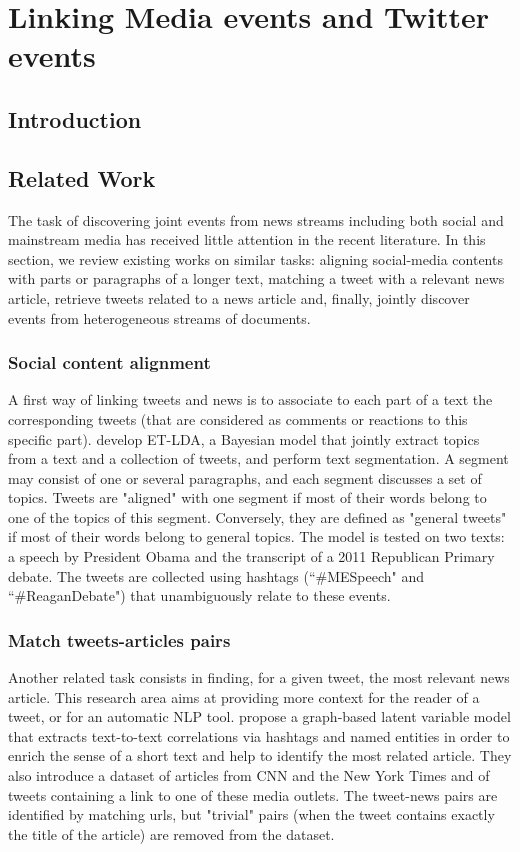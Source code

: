 \chapter{Linking Media events and Twitter events}
\section{Introduction}
\section{Related Work}

The task of discovering joint events from news streams including both social and mainstream media has received little attention in the recent literature. In this section, we review existing works on similar tasks: aligning social-media contents with parts or paragraphs of a longer text, matching a tweet with a relevant news article, retrieve tweets related to a news article and, finally, jointly discover events from heterogeneous streams of documents.

\subsection{Social content alignment}
\label{Social content alignment}
A first way of linking tweets and news is to associate to each part of a text the corresponding tweets (that are considered as comments or reactions to this specific part). \cite{hu_et-lda:_2012} develop ET-LDA, a Bayesian model that jointly extract topics from a text and a collection of tweets, and perform text segmentation. A segment may consist of one or several paragraphs, and each segment discusses a set of topics. Tweets are "aligned" with one segment if most of their words belong to one of the topics of this segment. Conversely, they are defined as "general tweets" if most of their words belong to general topics. The model is tested on two texts: a speech by President Obama and the transcript of a 2011 Republican Primary debate. The tweets are collected using hashtags (``\#MESpeech" and ``\#ReaganDebate") that unambiguously relate to these events. 

\subsection{Match tweets-articles pairs}
\label{Match tweets-articles pairs}
Another related task consists in finding, for a given tweet, the most relevant news article. This research area aims at providing more context for the reader of a tweet, or for an automatic NLP tool. \cite{guo_linking_2013} propose a graph-based latent variable model that extracts text-to-text correlations via hashtags and named entities in order to enrich the sense of a short text and help to identify the most related article. They also introduce a dataset of articles from CNN and the New York Times and of tweets containing a link to one of these media outlets. The tweet-news pairs are identified by matching urls, but "trivial" pairs (when the tweet contains exactly the title of the article) are removed from the dataset.

